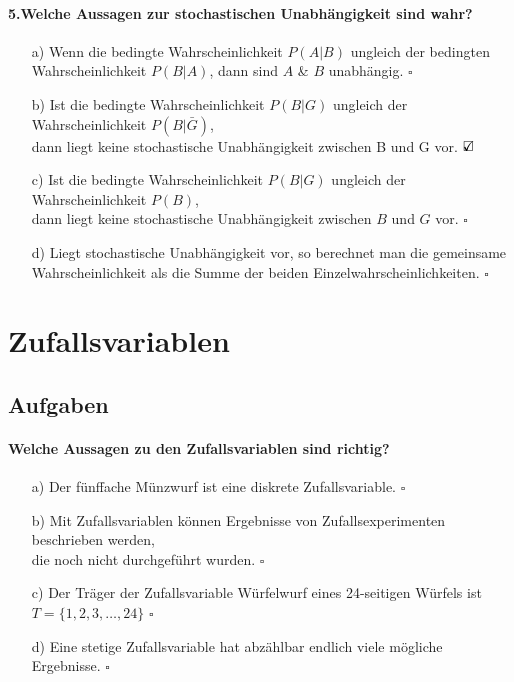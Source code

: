 \documentclass[a4paper]{article}
\begin{document}
\paragraph{5.Welche Aussagen zur stochastischen Unabhängigkeit sind wahr?}
\begin{itemize}
    \item[a)] Wenn die bedingte Wahrscheinlichkeit $P(A|B)$ ungleich der bedingten\\Wahrscheinlichkeit $P(B|A)$, dann sind $A$ \& $B$ unabhängig. \hfill $\square$
    \item[b)] Ist die bedingte Wahrscheinlichkeit $P(B|G)$ ungleich der Wahrscheinlichkeit $P(B|\bar G)$, \\dann liegt keine stochastische Unabhängigkeit zwischen B und G vor. \hfill $\text{\rlap{$\checkmark$}}\square$
    \item[c)] Ist die bedingte Wahrscheinlichkeit $P(B|G)$ ungleich der Wahrscheinlichkeit $P(B)$, \\dann liegt keine stochastische Unabhängigkeit zwischen $B$ und $G$ vor. \hfill $\square$
    \item[d)] Liegt stochastische Unabhängigkeit vor, so berechnet man die gemeinsame\\ Wahrscheinlichkeit als die Summe der beiden Einzelwahrscheinlichkeiten. \hfill $\square$
\end{itemize}


\clearpage


\section{Zufallsvariablen}\label{chap:zv}

\subsection{Aufgaben}
\paragraph{Welche Aussagen zu den Zufallsvariablen sind richtig?}
\begin{itemize}
    \item[a)] Der fünffache Münzwurf ist eine diskrete Zufallsvariable. \hfill $\square$
    \item[b)] Mit Zufallsvariablen können Ergebnisse von Zufallsexperimenten beschrieben werden,\\ die noch nicht durchgeführt wurden. \hfill $\square$
    \item[c)] Der Träger der Zufallsvariable Würfelwurf eines 24-seitigen Würfels ist\\ $T = \{1, 2, 3, \hdots, 24\}$ \hfill $\square$
    \item[d)] Eine stetige Zufallsvariable hat abzählbar endlich viele mögliche Ergebnisse. \hfill $\square$
\end{itemize}
\end{document}
